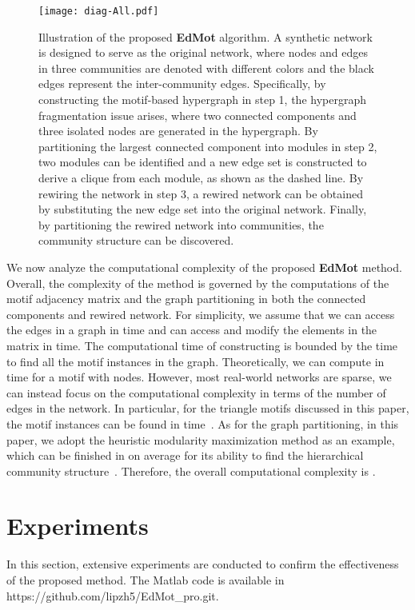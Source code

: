 \documentclass[sigconf]{acmart}
\begin{document}
\begin{figure*}[!t]
\centering \texttt{[image: diag-All.pdf]}\caption{Illustration of the proposed \textbf{EdMot} algorithm. A synthetic network is designed to serve as the original network, where nodes and edges in three communities are denoted with different colors and the black edges represent the inter-community edges. Specifically, by constructing the motif-based hypergraph in step 1, the hypergraph fragmentation issue arises, where two connected components and three isolated nodes are generated in the hypergraph. By partitioning the largest connected component into modules in step 2, two modules can be identified and a new edge set is constructed to derive a clique from each module, as shown as the dashed line. By rewiring the network in step 3, a rewired network can be obtained by substituting the new edge set into the original network. Finally, by partitioning the rewired network into communities, the community structure can be discovered.} \label{fig:diagall}\end{figure*}

We now analyze the computational complexity of the proposed \textbf{EdMot} method. Overall, the complexity of the method is governed by the computations of the motif adjacency matrix  and the graph partitioning in both the connected components and rewired network. For simplicity, we assume that we can access the edges in a graph in  time and can access and modify the elements in the matrix in  time. The computational time of constructing  is bounded by the time to find all the motif instances in the graph. Theoretically, we can compute  in  time for a motif with  nodes. However, most real-world networks are sparse, we can instead focus on the computational complexity in terms of the number of edges in the network. In particular, for the triangle motifs discussed in this paper, the motif instances can be found in  time~\cite{latapy2008main,Berry2014Why,benson2016higher}. As for the graph partitioning, in this paper, we adopt the heuristic modularity maximization method as an example, which can be finished in  on average for its ability to find the hierarchical community structure~\cite{Vincent2008Fast}. Therefore, the overall computational complexity is .

\section{Experiments}
\label{sec:experiments}
In this section, extensive experiments are conducted to confirm the effectiveness of the proposed method. The Matlab code is available in https://github.com/lipzh5/EdMot\_pro.git.
\end{document}
